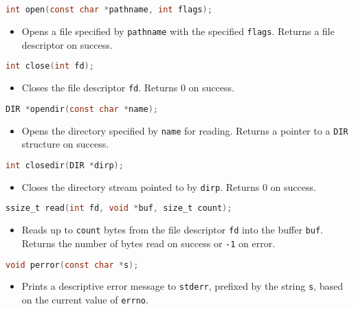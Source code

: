 \documentclass[twoside]{article}
\begin{document}
\begin{summary}
\begin{lstlisting}[language=C]
int open(const char *pathname, int flags);
\end{lstlisting}
    \begin{itemize}
        \item Opens a file specified by \texttt{pathname} with the specified \texttt{flags}. Returns a file descriptor on success.
    \end{itemize}

\begin{lstlisting}[language=C]
int close(int fd);
\end{lstlisting}
    \begin{itemize}
        \item Closes the file descriptor \texttt{fd}. Returns 0 on success.
    \end{itemize}

\begin{lstlisting}[language=C]
DIR *opendir(const char *name);
\end{lstlisting}
    \begin{itemize}
        \item Opens the directory specified by \texttt{name} for reading. Returns a pointer to a \texttt{DIR} structure on success.
    \end{itemize}

\begin{lstlisting}[language=C]
int closedir(DIR *dirp);
\end{lstlisting}
    \begin{itemize}
        \item Closes the directory stream pointed to by \texttt{dirp}. Returns 0 on success.
    \end{itemize}

\begin{lstlisting}[language=C]
ssize_t read(int fd, void *buf, size_t count);
\end{lstlisting}
    \begin{itemize}
        \item Reads up to \texttt{count} bytes from the file descriptor \texttt{fd} into the buffer \texttt{buf}. Returns the number of bytes read on success or \texttt{-1} on error.
    \end{itemize}

\begin{lstlisting}[language=C]
void perror(const char *s);
\end{lstlisting}
    \begin{itemize}
        \item Prints a descriptive error message to \texttt{stderr}, prefixed by the string \texttt{s}, based on the current value of \texttt{errno}.
    \end{itemize}


\end{summary}
\end{document}
